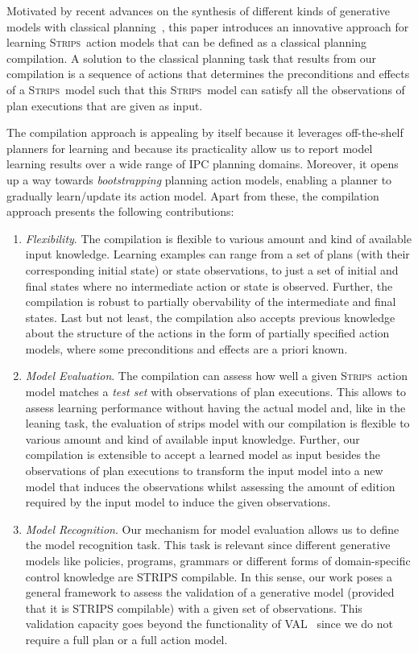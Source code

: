 \documentclass[3p,times]{elsarticle}
\newcommand{\strips}{\textsc{Strips}}     %
\begin{document}
Motivated by recent advances on the synthesis of different kinds of generative models with classical planning~\cite{bonet2009automatic,segovia2016generalized,segovia2016hierarchical,segovia2017generating}, this paper introduces an innovative approach for learning \strips\ action models that can be defined as a classical planning compilation. A solution to the classical planning task that results from our compilation is a sequence of actions that determines the preconditions and effects of a \strips\ model such that this \strips\ model can satisfy all the observations of plan executions that are given as input.

The compilation approach is appealing by itself because it leverages off-the-shelf planners for learning and because its practicality allow us to report model learning results over a wide range of IPC planning domains. Moreover, it opens up a way towards \emph{bootstrapping} planning action models, enabling a planner to gradually learn/update its action model. Apart from these, the compilation approach presents the following contributions:
\begin{enumerate}
\item {\em Flexibility}. The compilation is flexible to various amount and kind of available input knowledge. Learning examples can range from a set of plans (with their corresponding initial state) or state observations, to just a set of initial and final states where no intermediate action or state is observed. Further, the compilation is robust to partially obervability of the intermediate and final states. Last but not least, the compilation also accepts previous knowledge about the structure of the actions in the form of partially specified action models, where some preconditions and effects are a priori known. %

\item {\em Model Evaluation}. The compilation can assess how well a given \strips\ action model matches a {\em test set} with observations of plan executions. This allows to assess learning performance without having the actual model and, like in the leaning task, the evaluation of strips model with our compilation is flexible to various amount and kind of available input knowledge. Further, our compilation is extensible to accept a learned model as input besides the observations of plan executions to transform the input model into a new model that induces the observations whilst assessing the amount of edition required by the input model to induce the given observations. 

\item {\em Model Recognition}. Our mechanism for model evaluation allows us to define the model recognition task. This task is relevant since different generative models like policies, programs, grammars or different forms of domain-specific control knowledge are STRIPS compilable. In this sense, our work poses a general framework to assess the validation of a generative model (provided that it is STRIPS compilable) with a given set of observations. This validation capacity goes beyond the functionality of VAL~\cite{howey2004val} since we do not require a full plan or a full action model.
\end{enumerate}
\end{document}
